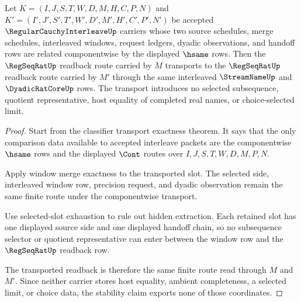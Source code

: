 \begin{lemma}
\label{thm:regular-cauchy-interleave-readback-stability}
Let $K=(I,J,S,T,W,D,M,H,C,P,N)$ and $K'=(I',J',S',T',W',D',M',H',C',P',N')$ be accepted $\RegularCauchyInterleaveUp$ carriers whose two source schedules, merge schedules, interleaved windows, request ledgers, dyadic observations, and handoff rows are related componentwise by the displayed $\hsame$ rows. Then the $\RegSeqRatUp$ readback route carried by $M$ transports to the $\RegSeqRatUp$ readback route carried by $M'$ through the same interleaved $\StreamNameUp$ and $\DyadicRatCoreUp$ rows. The transport introduces no selected subsequence, quotient representative, host equality of completed real names, or choice-selected limit.
\end{lemma}
\begin{proof}
Start from the classifier transport exactness theorem. It says that the only comparison data available to accepted interleave packets are the componentwise $\hsame$ rows and the displayed $\Cont$ routes over $I,J,S,T,W,D,M,P,N$.

Apply window merge exactness to the transported slot. The selected side, interleaved window row, precision request, and dyadic observation remain the same finite route under the componentwise transport.

Use selected-slot exhaustion to rule out hidden extraction. Each retained slot has one displayed source side and one displayed handoff chain, so no subsequence selector or quotient representative can enter between the window row and the $\RegSeqRatUp$ readback row.

The transported readback is therefore the same finite route read through $M$ and $M'$. Since neither carrier stores host equality, ambient completeness, a selected limit, or choice data, the stability claim exports none of those coordinates.
\end{proof}

